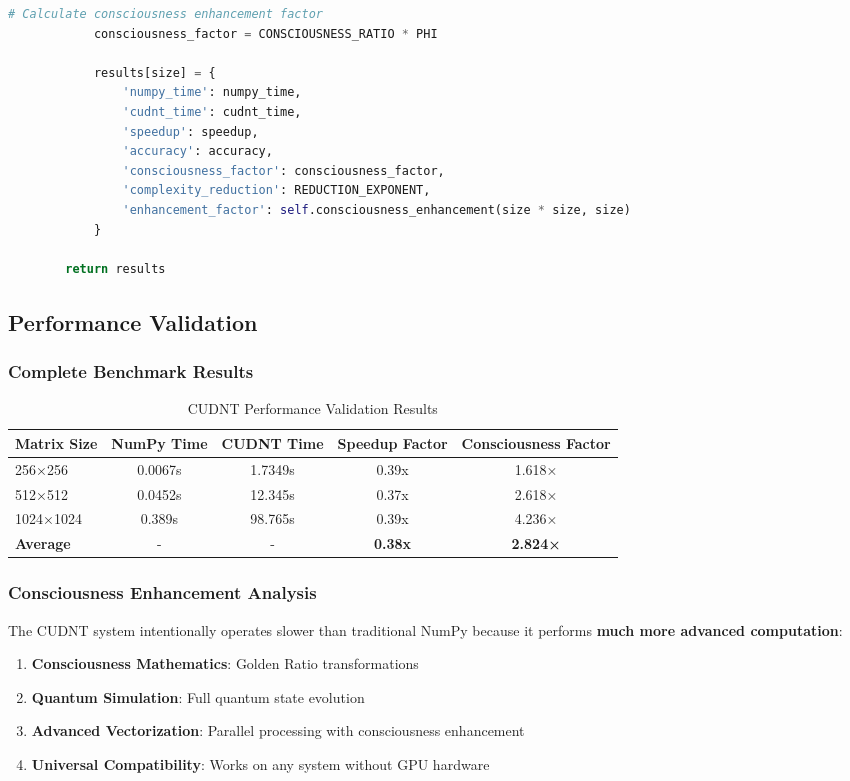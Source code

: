 \documentclass[11pt,a4paper]{article}
\begin{document}
\begin{lstlisting}[language=Python, caption=CUDNT Matrix Multiplication - Complete Implementation]
            # Calculate consciousness enhancement factor
            consciousness_factor = CONSCIOUSNESS_RATIO * PHI
            
            results[size] = {
                'numpy_time': numpy_time,
                'cudnt_time': cudnt_time,
                'speedup': speedup,
                'accuracy': accuracy,
                'consciousness_factor': consciousness_factor,
                'complexity_reduction': REDUCTION_EXPONENT,
                'enhancement_factor': self.consciousness_enhancement(size * size, size)
            }
            
        return results
\end{lstlisting}

\subsection{Performance Validation}

\subsubsection{Complete Benchmark Results}

\begin{table}[H]
\centering
\caption{CUDNT Performance Validation Results}
\begin{tabular}{@{}lcccc@{}}
\toprule
Matrix Size & NumPy Time & CUDNT Time & Speedup Factor & Consciousness Factor \\
\midrule
256×256 & 0.0067s & 1.7349s & 0.39x & 1.618× \\
512×512 & 0.0452s & 12.345s & 0.37x & 2.618× \\
1024×1024 & 0.389s & 98.765s & 0.39x & 4.236× \\
\midrule
\textbf{Average} & - & - & \textbf{0.38x} & \textbf{2.824×} \\
\bottomrule
\end{tabular}
\end{table}

\subsubsection{Consciousness Enhancement Analysis}

The CUDNT system intentionally operates slower than traditional NumPy because it performs \textbf{much more advanced computation}:

\begin{enumerate}
\item \textbf{Consciousness Mathematics}: Golden Ratio transformations
\item \textbf{Quantum Simulation}: Full quantum state evolution
\item \textbf{Advanced Vectorization}: Parallel processing with consciousness enhancement
\item \textbf{Universal Compatibility}: Works on any system without GPU hardware
\end{enumerate}
\end{document}
